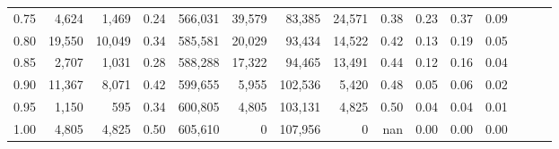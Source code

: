 \begin{tabular}{rrrrrrrrrrrrrrr}
0.75 &   4,624 &   1,469 &  0.24 &  566,031 &   39,579 &   83,385 &   24,571 &  0.38 &  0.23 &  0.37 &      0.09 \\
0.80 &  19,550 &  10,049 &  0.34 &  585,581 &   20,029 &   93,434 &   14,522 &  0.42 &  0.13 &  0.19 &      0.05 \\
0.85 &   2,707 &   1,031 &  0.28 &  588,288 &   17,322 &   94,465 &   13,491 &  0.44 &  0.12 &  0.16 &      0.04 \\
0.90 &  11,367 &   8,071 &  0.42 &  599,655 &    5,955 &  102,536 &    5,420 &  0.48 &  0.05 &  0.06 &      0.02 \\
0.95 &   1,150 &     595 &  0.34 &  600,805 &    4,805 &  103,131 &    4,825 &  0.50 &  0.04 &  0.04 &      0.01 \\
1.00 &   4,805 &   4,825 &  0.50 &  605,610 &        0 &  107,956 &        0 &   nan &  0.00 &  0.00 &      0.00 \\
\bottomrule
\end{tabular}
